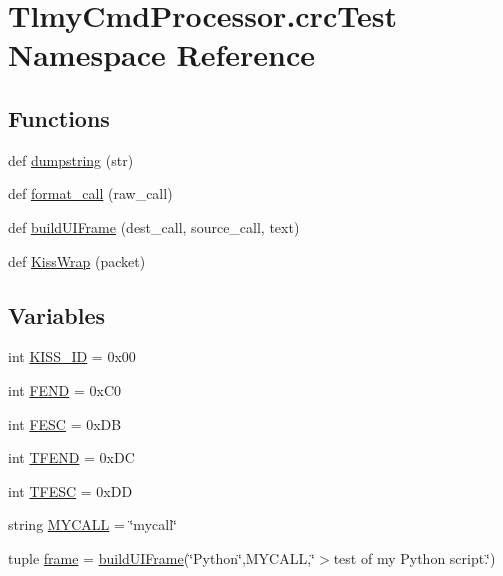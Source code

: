 \hypertarget{namespace_tlmy_cmd_processor_1_1crc_test}{}\section{Tlmy\+Cmd\+Processor.\+crc\+Test Namespace Reference}
\label{namespace_tlmy_cmd_processor_1_1crc_test}
\subsection*{Functions}
\begin{DoxyCompactItemize}
\item 
def \hyperlink{namespace_tlmy_cmd_processor_1_1crc_test_a7e21fb91ca88cd29177b445348a3eb0e}{dumpstring} (str)
\item 
def \hyperlink{namespace_tlmy_cmd_processor_1_1crc_test_a061c627704da9854735d95ad28cde5b0}{format\+\_\+call} (raw\+\_\+call)
\item 
def \hyperlink{namespace_tlmy_cmd_processor_1_1crc_test_a270412ab0dd2a85fbd5148022707ab60}{build\+U\+I\+Frame} (dest\+\_\+call, source\+\_\+call, text)
\item 
def \hyperlink{namespace_tlmy_cmd_processor_1_1crc_test_a38ed04fa76bfc3c4aa83675fa2f648cf}{Kiss\+Wrap} (packet)
\end{DoxyCompactItemize}
\subsection*{Variables}
\begin{DoxyCompactItemize}
\item 
int \hyperlink{namespace_tlmy_cmd_processor_1_1crc_test_a570cd914a6c92d3588704c88602d5ddc}{K\+I\+S\+S\+\_\+\+I\+D} = 0x00
\item 
int \hyperlink{namespace_tlmy_cmd_processor_1_1crc_test_ac52232eac5fd2a59b1f0c996b28f1f6f}{F\+E\+N\+D} = 0x\+C0
\item 
int \hyperlink{namespace_tlmy_cmd_processor_1_1crc_test_adf72d70ac27f8e10a0105fcd023aae6d}{F\+E\+S\+C} = 0x\+D\+B
\item 
int \hyperlink{namespace_tlmy_cmd_processor_1_1crc_test_a0c53a9252c9f79e6e39eb47f43f9b79a}{T\+F\+E\+N\+D} = 0x\+D\+C
\item 
int \hyperlink{namespace_tlmy_cmd_processor_1_1crc_test_a60b1bb9a6efaef0a1421d38c2c05febd}{T\+F\+E\+S\+C} = 0x\+D\+D
\item 
string \hyperlink{namespace_tlmy_cmd_processor_1_1crc_test_ae763384037b73e8a02ac30a08c0f6239}{M\+Y\+C\+A\+L\+L} = \char`\"{}mycall\char`\"{}
\item 
tuple \hyperlink{namespace_tlmy_cmd_processor_1_1crc_test_a28e7bdc26cab757551ee8a5c58656a0b}{frame} = \hyperlink{namespace_tlmy_cmd_processor_1_1crc_test_a270412ab0dd2a85fbd5148022707ab60}{build\+U\+I\+Frame}(\char`\"{}Python\char`\"{},M\+Y\+C\+A\+L\+L,\char`\"{}$>$test of my Python script.\char`\"{})
\end{DoxyCompactItemize}


